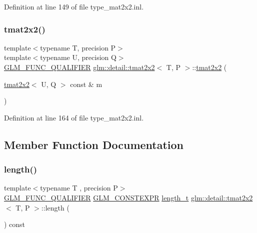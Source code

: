 Definition at line 149 of file type\+\_\+mat2x2.\+inl.

\mbox{\label{structglm_1_1detail_1_1tmat2x2_a0eed2a609688233e8c0f3abe1e32d036}} 
\subsubsection{\texorpdfstring{tmat2x2()}{tmat2x2()}\hspace{0.1cm}{\footnotesize\ttfamily [22/22]}}
{\footnotesize\ttfamily template$<$typename T, precision P$>$ \\
template$<$typename U, precision Q$>$ \\
\hyperlink{setup_8hpp_a33fdea6f91c5f834105f7415e2a64407}{G\+L\+M\+\_\+\+F\+U\+N\+C\+\_\+\+Q\+U\+A\+L\+I\+F\+I\+ER} \hyperlink{structglm_1_1detail_1_1tmat2x2}{glm\+::detail\+::tmat2x2}$<$ T, P $>$\+::\hyperlink{structglm_1_1detail_1_1tmat2x2}{tmat2x2} (\begin{DoxyParamCaption}\item[{\hyperlink{structglm_1_1detail_1_1tmat2x2}{tmat2x2}$<$ U, Q $>$ const \&}]{m }\end{DoxyParamCaption})}



Definition at line 164 of file type\+\_\+mat2x2.\+inl.



\subsection{Member Function Documentation}
\mbox{\label{structglm_1_1detail_1_1tmat2x2_a9d5d54591b86cea1a75c4239ea1ac120}} 
\subsubsection{\texorpdfstring{length()}{length()}}
{\footnotesize\ttfamily template$<$typename T , precision P$>$ \\
\hyperlink{setup_8hpp_a33fdea6f91c5f834105f7415e2a64407}{G\+L\+M\+\_\+\+F\+U\+N\+C\+\_\+\+Q\+U\+A\+L\+I\+F\+I\+ER} \hyperlink{setup_8hpp_a08b807947b47031d3a511f03f89645ad}{G\+L\+M\+\_\+\+C\+O\+N\+S\+T\+E\+X\+PR} \hyperlink{namespaceglm_a090a0de2260835bee80e71a702492ed9}{length\+\_\+t} \hyperlink{structglm_1_1detail_1_1tmat2x2}{glm\+::detail\+::tmat2x2}$<$ T, P $>$\+::length (\begin{DoxyParamCaption}{ }\end{DoxyParamCaption}) const}



